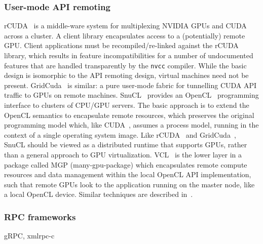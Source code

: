 \subsubsection{User-mode API remoting}

rCUDA~\cite{rCUDA, rCUDAnew} is a middle-ware system for multiplexing
	NVIDIA GPUs and CUDA across a cluster.
	A client library encapsulates access to a (potentially) remote GPU. Client applications must
	be recompiled/re-linked against the rCUDA library, which results
	in feature incompatibilities for a number of undocumented features that are handled transparently
	by the {\tt nvcc} compiler. While the basic design is isomorphic to the API remoting design, virtual machines
	need not be present.
GridCuda~\cite{GridCuda} is similar: a pure
	user-mode fabric for tunnelling CUDA API traffic to GPUs on remote machines.
	SnuCL~\cite{kim2012snucl} provides an OpenCL~\cite{openCLspec} programming interface
	to clusters of CPU/GPU servers. The basic approach is to extend the OpenCL semantics to encapsulate
	remote resources, which preserves the original programming model which, like CUDA~\cite{CUDA:Programming-Guide}, assumes
	a process model, running in the context of a single operating system image. Like rCUDA~\cite{rCUDA}
	and GridCuda~\cite{GridCuda}, SnuCL should be viewed as a distributed runtime that supports GPUs,
	rather than a general approach to GPU virtualization.
 VCL~\cite{VCL} is the lower layer in a package called MGP (many-gpu-package)
   which encapsulates remote compute resources and
   data management within the local OpenCL API implementation, such that remote GPUs look to the application running on the
   master node, like a local OpenCL device.
   Similar techniques are described in~\cite{Duato:2009:EIG:1884795.1884840,Li:2011:GRS:2066302.2066933, Xiao:2012:TAM:2310096.2310143}.

\subsubsection{RPC frameworks}

gRPC, xmlrpc-c

